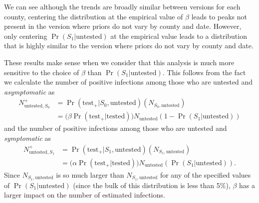 \documentclass[12pt,twoside]{smiththesis}
\begin{document}
We can see although the trends are broadly similar between versions for each county, centering the distribution at the empirical value of \(\beta\) leads to peaks not present in the version where priors do not vary by county and date. However, only centering \(\Pr(S_1|\text{untested})\) at the empirical value leads to a distribution that is highly similar to the version where priors do not vary by county and date.

These results make sense when we consider that this analysis is much more sensitive to the choice of \(\beta\) than \(\Pr(S_1|\text{untested})\). This follows from the fact we calculate the number of positive infections among those who are untested and \emph{asymptomatic} as
\begin{align*}
N^+_{\text{untested},S_0} &= \Pr(\text{test}_+| S_0,\text{untested}) (N_{S_0,\text{untested}})\\
&= \Big( \beta \Pr(\text{test}_+ |\text{tested}) \Big) N_{\text{untested}} (1-\Pr(S_1|\text{untested}))
\end{align*}
and the number of positive infections among those who are untested and \emph{symptomatic} as\\
\begin{align*} N^+_{\text{untested},S_1}& = \Pr(\text{test}_+| S_1,\text{untested}) (N_{S_1,\text{untested}})\\
&= \Big( \alpha \Pr(\text{test}_+ |\text{tested}) \Big) N_{\text{untested}} (\Pr(S_1|\text{untested})).
\end{align*}
Since \(N_{S_1, \text{untested}}\) is so much larger than \(N_{S_1, \text{untested}}\) for any of the specified values of \(\Pr(S_1|\text{untested})\) (since the bulk of this distribution is less than 5\%), \(\beta\) has a larger impact on the number of estimated infections.

~

~

~

~

~

~

~

~

~

~

~

~

~

~

~

~

~
\end{document}
